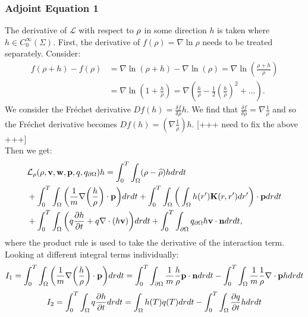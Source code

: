 \subsubsection{Adjoint Equation 1}

The derivative of $\mathcal{L}$ with respect to $\rho$ in some direction $h$ is taken where ${h} \in C_0^\infty(\Sigma) $.
First, the derivative of $f(\rho) = \nabla \ln \rho $ needs to be treated separately. 
Consider:
\begin{align*}
f(\rho + h) - f(\rho) &= \nabla \ln(\rho +h) - \nabla \ln(\rho)  = \nabla \ln \left(\frac{\rho + h}{\rho}\right) \\
&= \nabla \ln\left(1 + \frac{h}{\rho}\right) = \nabla \left(\frac{h}{\rho} - \frac{1}{2}\left(\frac{h}{\rho}\right)^2 + ...\right).
\end{align*}
{\color{blue} We consider the Fr\'echet derivative $Df(h) = \frac{\delta f}{\delta \rho}h$. We find that $\frac{\delta f}{\delta \rho} = \nabla \frac{1}{\rho}$ and so the Fr\'echet derivative becomes $Df(h) = \left(\nabla \frac{1}{\rho}\right)h$. [+++ need to fix the above +++] }\\
Then we get:
\begin{align*}
&\mathcal{L}_\rho(\rho,\mathbf{v},\mathbf{w},\mathbf{p},q,{q}_{\partial \Omega})h = \int_0^T \int_\Omega  (\rho - \widehat {\rho})h drdt \\
&+ \int_0^T \int_\Omega \bigg( \frac{1}{m}\nabla \bigg(\frac{h}{\rho}\bigg)\cdot \mathbf{p} \bigg)  dr dt + \int_0^T \int_\Omega \bigg(\int_\Omega h(r') \mathbf{K}(r,r') dr'\bigg) \cdot \mathbf{p} dr dt\\
& + \int_0^T \int_\Omega \bigg(q\frac{\partial h}{\partial t} + q\nabla \cdot (h \mathbf{v})\bigg)  dr dt +\int_0^T \int_{\partial\Omega} {q}_{\partial \Omega} h\mathbf{v} \cdot \mathbf{n}  dr dt,
\end{align*}
where the product rule is used to take the derivative of the interaction term.
Looking at different integral terms individually:
\begin{align*}
I_1 = \int_0^T \int_\Omega \bigg( \frac{1}{m}\nabla \bigg(\frac{h}{\rho}\bigg)\cdot \mathbf{p} \bigg)  dr dt  = \int_0^T \int_{\partial \Omega} \frac{1}{m} \frac{h}{\rho} \mathbf{p} \cdot \mathbf{n} dr dt - \int_0^T \int_\Omega \frac{1}{m} \frac{1}{\rho}\nabla \cdot \mathbf{p} h dr dt 
\end{align*}
\begin{align*}
I_2 = \int_0^T \int_\Omega q\frac{\partial h}{\partial t} dr dt = \int_\Omega h(T) q(T) dr dt - \int_0^T \int_\Omega  \frac{\partial q}{\partial t}h dr dt
\end{align*}

